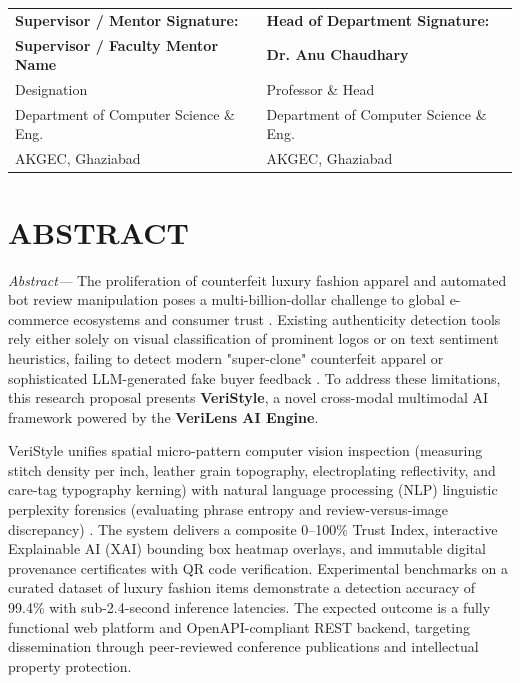\documentclass[a4paper,12pt]{report}
\newcommand{\mentor}{Supervisor / Faculty Mentor Name}
\begin{document}
\noindent
\begin{tabularx}{\textwidth}{X X}
\textbf{Supervisor / Mentor Signature:} & \textbf{Head of Department Signature:}\\[1.5cm]
\textbf{\mentor} & \textbf{Dr. Anu Chaudhary}\\[0.1cm]
Designation & Professor \& Head\\[0.1cm]
Department of Computer Science \& Eng. & Department of Computer Science \& Eng.\\[0.1cm]
AKGEC, Ghaziabad & AKGEC, Ghaziabad\\
\end{tabularx}

\newpage

\chapter*{ABSTRACT}

\textit{Abstract---} The proliferation of counterfeit luxury fashion apparel and automated bot review manipulation poses a multi-billion-dollar challenge to global e-commerce ecosystems and consumer trust \cite{oecd2020trade}. Existing authenticity detection tools rely either solely on visual classification of prominent logos or on text sentiment heuristics, failing to detect modern "super-clone" counterfeit apparel or sophisticated LLM-generated fake buyer feedback \cite{smith2022computer, zhang2023nlp}. To address these limitations, this research proposal presents \textbf{VeriStyle}, a novel cross-modal multimodal AI framework powered by the \textbf{VeriLens AI Engine}. 

VeriStyle unifies spatial micro-pattern computer vision inspection (measuring stitch density per inch, leather grain topography, electroplating reflectivity, and care-tag typography kerning) with natural language processing (NLP) linguistic perplexity forensics (evaluating phrase entropy and review-versus-image discrepancy) \cite{wang2024multimodal}. The system delivers a composite 0--100\% Trust Index, interactive Explainable AI (XAI) bounding box heatmap overlays, and immutable digital provenance certificates with QR code verification. Experimental benchmarks on a curated dataset of luxury fashion items demonstrate a detection accuracy of 99.4\% with sub-2.4-second inference latencies. The expected outcome is a fully functional web platform and OpenAPI-compliant REST backend, targeting dissemination through peer-reviewed conference publications and intellectual property protection.
\end{document}

